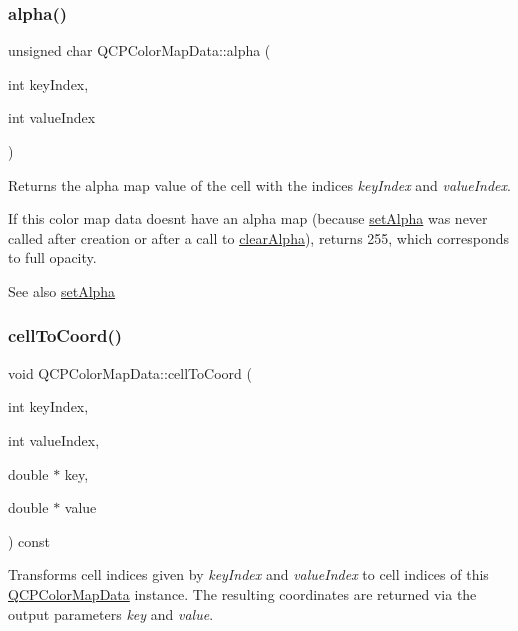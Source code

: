 \subsubsection{\texorpdfstring{alpha()}{alpha()}}
{\footnotesize\ttfamily unsigned char Q\+C\+P\+Color\+Map\+Data\+::alpha (\begin{DoxyParamCaption}\item[{int}]{key\+Index,  }\item[{int}]{value\+Index }\end{DoxyParamCaption})}

Returns the alpha map value of the cell with the indices {\itshape key\+Index} and {\itshape value\+Index}.

If this color map data doesn\textquotesingle{}t have an alpha map (because \hyperlink{classQCPColorMapData_aaf7de5b34c58f38d8f4c1ceb064a876c}{set\+Alpha} was never called after creation or after a call to \hyperlink{classQCPColorMapData_a14d08b9c3720cd719400079b86d3906b}{clear\+Alpha}), returns 255, which corresponds to full opacity.

\begin{DoxySeeAlso}{See also}
\hyperlink{classQCPColorMapData_aaf7de5b34c58f38d8f4c1ceb064a876c}{set\+Alpha} 
\end{DoxySeeAlso}
\mbox{\label{classQCPColorMapData_af1a36385c78ab624cd617065602408b6}} 
\subsubsection{\texorpdfstring{cell\+To\+Coord()}{cellToCoord()}}
{\footnotesize\ttfamily void Q\+C\+P\+Color\+Map\+Data\+::cell\+To\+Coord (\begin{DoxyParamCaption}\item[{int}]{key\+Index,  }\item[{int}]{value\+Index,  }\item[{double $\ast$}]{key,  }\item[{double $\ast$}]{value }\end{DoxyParamCaption}) const}

Transforms cell indices given by {\itshape key\+Index} and {\itshape value\+Index} to cell indices of this \hyperlink{classQCPColorMapData}{Q\+C\+P\+Color\+Map\+Data} instance. The resulting coordinates are returned via the output parameters {\itshape key} and {\itshape value}.

